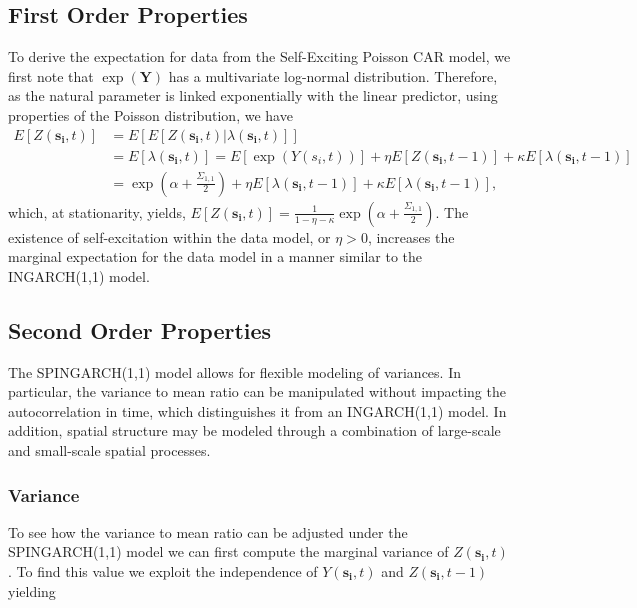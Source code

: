 \documentclass[11pt]{isuthesis}
\begin{document}
\subsection{First Order Properties}
 To derive the expectation for data from the Self-Exciting Poisson CAR model, we first note that $\exp(\boldsymbol{Y})$ has a multivariate log-normal distribution.  Therefore, as the natural parameter is linked exponentially with the linear predictor, using properties of the Poisson distribution, we have 
\begin{align}
	E\left[Z(\boldsymbol{s_i},t)\right] & = E\left[E\left[Z(\boldsymbol{s_i},t)|\lambda(\boldsymbol{s_i},t)\right]\right] \nonumber\\
	&= E\left[\lambda(\boldsymbol{s_i},t)\right]= E\left[\exp(Y(s_i,t))\right]+\eta E\left[Z(\boldsymbol{s_i},t-1)\right] +\kappa E\left[\lambda(\boldsymbol{s_i},t-1)\right] \nonumber\\
	& = \exp\left(\alpha+\frac{\Sigma_{1,1}}{2}\right)+\eta E\left[\lambda(\boldsymbol{s_i},t-1)\right] +\kappa E\left[\lambda(\boldsymbol{s_i},t-1)\right] \label{eq:Expectation},
\end{align}
which, at stationarity, yields, $E\left[Z(\boldsymbol{s_i},t)\right]=\frac{1}{1-\eta-\kappa}\exp(\alpha+\frac{\Sigma_{1,1}}{2})$.  The existence of self-excitation within the data model, or $\eta>0$, increases the marginal expectation for the data model in a manner similar to the INGARCH(1,1) model.  

\subsection{Second Order Properties}
The SPINGARCH(1,1) model allows for flexible modeling of variances.  In particular, the variance to mean ratio can be manipulated without impacting the autocorrelation in time, which distinguishes it from an INGARCH(1,1) model.  In addition, spatial structure may be modeled through a combination of large-scale and small-scale spatial processes.
\subsubsection{Variance}
To see how the variance to mean ratio can be adjusted under the SPINGARCH(1,1) model we can first compute the marginal variance of $Z(\boldsymbol{s_i},t)$. To find this value we exploit the independence of $Y(\boldsymbol{s_i},t)$ and $Z(\boldsymbol{s_i},t-1)$ yielding
\end{document}
